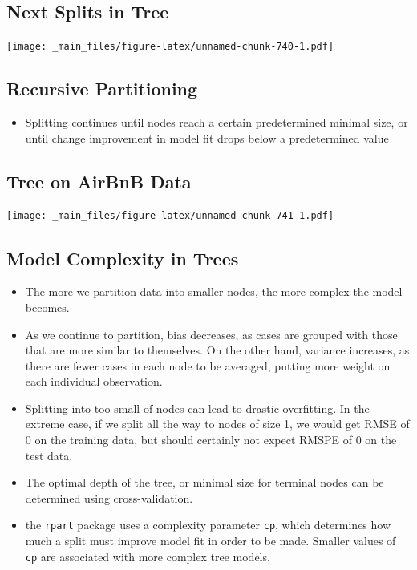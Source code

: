 \documentclass[]{book}
\providecommand{\tightlist}{%
  \setlength{\itemsep}{0pt}\setlength{\parskip}{0pt}}
\begin{document}
\subsection{Next Splits in Tree}\label{next-splits-in-tree}

\texttt{[image: \_main\_files/figure-latex/unnamed-chunk-740-1.pdf]}

\subsection{Recursive Partitioning}\label{recursive-partitioning}

\begin{itemize}
\tightlist
\item
  Splitting continues until nodes reach a certain predetermined minimal
  size, or until change improvement in model fit drops below a
  predetermined value
\end{itemize}

\subsection{Tree on AirBnB Data}\label{tree-on-airbnb-data}

\texttt{[image: \_main\_files/figure-latex/unnamed-chunk-741-1.pdf]}

\subsection{Model Complexity in Trees}\label{model-complexity-in-trees}

\begin{itemize}
\item
  The more we partition data into smaller nodes, the more complex the
  model becomes.
\item
  As we continue to partition, bias decreases, as cases are grouped with
  those that are more similar to themselves. On the other hand, variance
  increases, as there are fewer cases in each node to be averaged,
  putting more weight on each individual observation.
\item
  Splitting into too small of nodes can lead to drastic overfitting. In
  the extreme case, if we split all the way to nodes of size 1, we would
  get RMSE of 0 on the training data, but should certainly not expect
  RMSPE of 0 on the test data.
\item
  The optimal depth of the tree, or minimal size for terminal nodes can
  be determined using cross-validation.
\item
  the \texttt{rpart} package uses a complexity parameter \texttt{cp},
  which determines how much a split must improve model fit in order to
  be made. Smaller values of \texttt{cp} are associated with more
  complex tree models.
\end{itemize}
\end{document}
